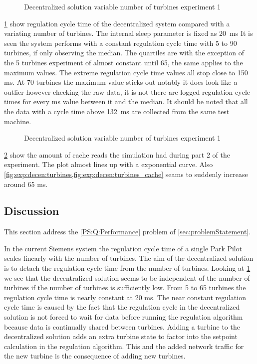 \begin{figure}[h!]
	\centering
	
	\caption{Decentralized solution variable number of turbines experiment 1}
	\label{fig:exp:decen:turbines}
\end{figure}

\cref{fig:exp:decen:turbines} show regulation cycle time of the decentralized system compared with a variating number of turbines. The internal sleep parameter is fixed as 20~ms
It is seen the system performs with a constant regulation cycle time with 5 to 90 turbines, if only observing the median.
The quartiles are with the exception of the 5 turbines experiment of almost constant until 65, the same applies to the maximum values.
The extreme regulation cycle time values all  stop close to 150 ms.
At 70 turbines the maximum value sticks out notably it does look like a outlier however checking the raw data, it is not there are logged regulation cycle times for every ms value between it and the median.
It should be noted that all the data with a cycle time above 132~ms are collected from the same test machine.

\begin{figure}[h!]
	\centering
	
	\caption{Decentralized solution variable number of turbines experiment 1}
	\label{fig:exp:decen:turbines_cache}
\end{figure}


\cref{fig:exp:decen:turbines_cache} show the amount of cache reads the simulation had during part 2 of the experiment.
The plot almost lines up with a exponential curve. Also \cref{fig:exp:decen:turbines,fig:exp:decen:turbines_cache} seams to suddenly increase around 65 ms.

\subsection{Discussion}
\label{sec:disc:turbinesVScycletime}
This section address the \ref{PS:Q:Performance} problem of \cref{sec:problemStatement}.

In the current Siemens system the regulation cycle time of a single Park Pilot scales linearly with the number of turbines.
The aim of the decentralized solution is to detach the regulation cycle time from the number of turbines. 
Looking at \cref{fig:exp:decen:turbines} we see that the decentralized solution seems to be independent of the number of turbines if the number of turbines is sufficiently low.
From 5 to 65 turbines the regulation cycle time is nearly constant at 20 ms.
The near constant regulation cycle time is caused by the fact that the regulation cycle in the decentralized solution is not forced to wait for data before running the regulation algorithm because data is continually shared between turbines. Adding a turbine to the decentralized solution adds an extra turbine state to factor into the setpoint calculation in the regulation algorithm. This and the added network traffic for the new turbine is the consequence of adding new turbines.

